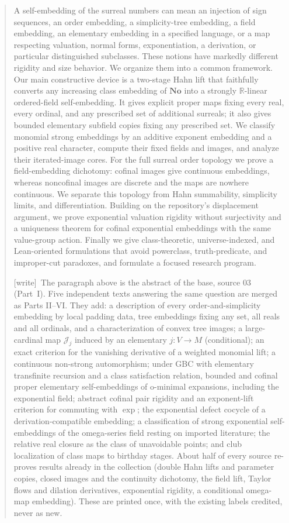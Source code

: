 \documentclass[11pt,a4paper]{article}
\numberwithin{equation}{section}
\theoremstyle{plain}
\theoremstyle{definition}
\theoremstyle{remark}
\newcommand{\No}{\mathbf{No}}
\newcommand{\R}{\mathbb{R}}
\newcommand{\wtag}{\textup{\textsf{[write]}}}%
\begin{document}
\begin{abstract}
A self-embedding of the surreal numbers can mean an injection of sign
sequences, an order embedding, a simplicity-tree embedding, a field
embedding, an elementary embedding in a specified language, or a map
respecting valuation, normal forms, exponentiation, a derivation, or
particular distinguished subclasses. These notions have markedly different
rigidity and size behavior. We organize them into a common framework.
Our main constructive device is a two-stage Hahn lift that faithfully
converts any increasing class embedding of $\No$ into a strongly
$\R$-linear ordered-field self-embedding. It gives explicit proper maps
fixing every real, every ordinal, and any prescribed set of additional
surreals; it also gives bounded elementary subfield copies fixing any
prescribed set. We classify monomial strong embeddings by an additive
exponent embedding and a positive real character, compute their fixed
fields and images, and analyze their iterated-image cores.
For the full surreal order topology we prove a field-embedding dichotomy:
cofinal images give continuous embeddings, whereas noncofinal images are
discrete and the maps are nowhere continuous. We separate this topology
from Hahn summability, simplicity limits, and differentiation.
Building on the repository's displacement argument, we prove exponential
valuation rigidity without surjectivity and a uniqueness theorem for
cofinal exponential embeddings with the same value-group action.
Finally we give class-theoretic, universe-indexed, and Lean-oriented
formulations that avoid powerclass, truth-predicate, and improper-cut
paradoxes, and formulate a focused research program.

\wtag\ The paragraph above is the abstract of the base, source 03 (Part~I).
Five independent texts answering the same question are merged as Parts
II--VI. They add: a description of every order-and-simplicity embedding by
local padding data, tree embeddings fixing any set, all reals and all
ordinals, and a characterization of convex tree images; a large-cardinal
map $\mathcal J_j$ induced by an elementary $j:V\to M$ (conditional);
an exact criterion for the vanishing derivative of a weighted monomial lift;
a continuous non-strong automorphism; under GBC with elementary transfinite
recursion and a class satisfaction relation, bounded and cofinal proper
elementary self-embeddings of o-minimal expansions, including the
exponential field; abstract cofinal pair rigidity and an exponent-lift
criterion for commuting with $\exp$; the exponential defect cocycle of a
derivation-compatible embedding; a classification of strong exponential
self-embeddings of the omega-series field resting on imported literature;
the relative real closure as the class of unavoidable points; and club
localization of class maps to birthday stages. About half of every source
re-proves results already in the collection (double Hahn lifts and parameter
copies, closed images and the continuity dichotomy, the field lift, Taylor
flows and dilation derivatives, exponential rigidity, a conditional
omega-map embedding). These are printed once, with the existing labels
credited, never as new.
\end{abstract}
\end{document}
